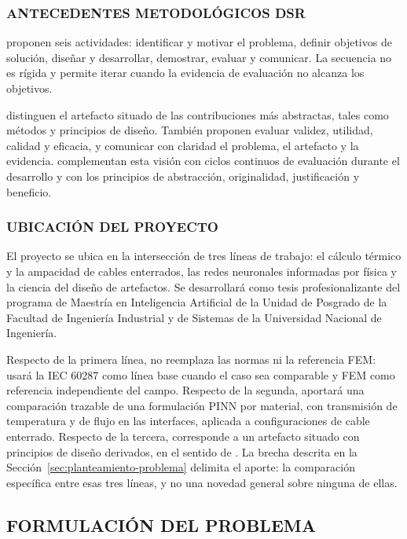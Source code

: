 \documentclass[11pt,a4paper,oneside]{report}
\begin{document}
\subsubsection{ANTECEDENTES METODOLÓGICOS DSR}

\textcite[54--56]{peffers2007} proponen seis actividades: identificar y motivar el problema, definir objetivos de solución, diseñar y desarrollar, demostrar, evaluar y comunicar. La secuencia no es rígida y permite iterar cuando la evidencia de evaluación no alcanza los objetivos.

\textcite[342--350]{gregor2013} distinguen el artefacto situado de las contribuciones más abstractas, tales como métodos y principios de diseño. También proponen evaluar validez, utilidad, calidad y eficacia, y comunicar con claridad el problema, el artefacto y la evidencia. \textcite[198--203]{delport2024} complementan esta visión con ciclos continuos de evaluación durante el desarrollo y con los principios de abstracción, originalidad, justificación y beneficio.

\subsubsection{UBICACIÓN DEL PROYECTO}

El proyecto se ubica en la intersección de tres líneas de trabajo: el cálculo térmico y la ampacidad de cables enterrados, las redes neuronales informadas por física y la ciencia del diseño de artefactos. Se desarrollará como tesis profesionalizante del programa de Maestría en Inteligencia Artificial de la Unidad de Posgrado de la Facultad de Ingeniería Industrial y de Sistemas de la Universidad Nacional de Ingeniería.

Respecto de la primera línea, no reemplaza las normas ni la referencia FEM: usará la IEC 60287 como línea base cuando el caso sea comparable y FEM como referencia independiente del campo. Respecto de la segunda, aportará una comparación trazable de una formulación PINN por material, con transmisión de temperatura y de flujo en las interfaces, aplicada a configuraciones de cable enterrado. Respecto de la tercera, corresponde a un artefacto situado con principios de diseño derivados, en el sentido de \textcite[342--350]{gregor2013}. La brecha descrita en la Sección~\ref{sec:planteamiento-problema} delimita el aporte: la comparación específica entre esas tres líneas, y no una novedad general sobre ninguna de ellas.

\subsection{FORMULACIÓN DEL PROBLEMA}
\end{document}
